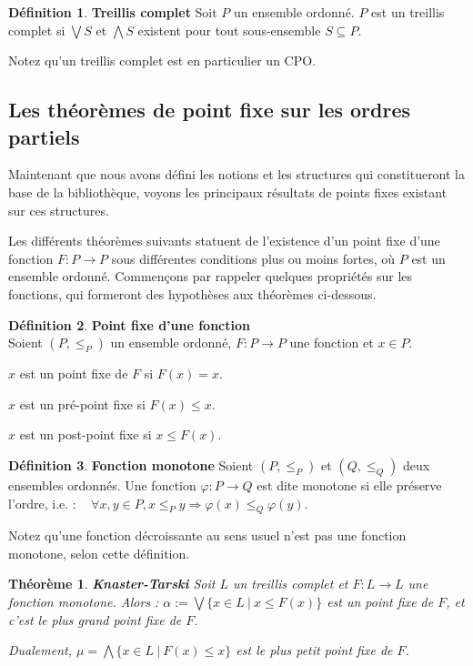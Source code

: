 \documentclass{article}
\newtheorem{theorem}{Théorème}[section]
\theoremstyle{definition}
\newtheorem{definition}{Définition}[section]
\begin{document}
\begin{definition}{\textbf{Treillis complet}}
Soit $P$ un ensemble ordonné. $P$ est un treillis complet si $\bigvee S$ et $\bigwedge S$ existent pour tout sous-ensemble $S \subseteq P$.

\end{definition}
Notez qu'un treillis complet est en particulier un CPO.

\subsection{Les théorèmes de point fixe sur les ordres partiels}

Maintenant que nous avons défini les notions et les structures qui constitueront la base de la bibliothèque, voyons les principaux résultats de points fixes existant sur ces structures.

Les différents théorèmes suivants statuent de l'existence d'un point fixe d'une fonction $F : P \rightarrow P$ sous différentes conditions plus ou moins fortes, où $P$ est un ensemble ordonné. Commençons par rappeler quelques propriétés sur les fonctions, qui formeront des hypothèses aux théorèmes ci-dessous.

\begin{definition}{\textbf{Point fixe d'une fonction\\}}
\label{fixpoint-def}
Soient $(P, \leq_P)$ un ensemble ordonné, $F : P \rightarrow P$ une fonction et $x \in P$. 

$x$ est un point fixe de $F$ si $F(x) = x$.

$x$ est un pré-point fixe si $F(x) \leq x$.

$x$ est un post-point fixe si $x \leq F(x)$.
\end{definition}

\begin{definition}{\textbf{Fonction monotone}}
Soient $(P, \leq_P)$ et $(Q, \leq_Q)$ deux ensembles ordonnés. Une fonction $\varphi : P \rightarrow Q$ est dite monotone si elle préserve l'ordre, i.e. : ~ $\forall x, y \in P, x \leq_P y \Longrightarrow \varphi(x) \leq_Q \varphi(y)$.

Notez qu'une fonction décroissante au sens usuel n'est pas une fonction monotone, selon cette définition.
\end{definition}

\begin{theorem}{\textbf{Knaster-Tarski}}
Soit $L$ un treillis complet et $F : L \rightarrow L$ une fonction monotone. Alors :
$ \alpha := \bigvee \{x \in L ~|~ x \leq F(x)\}$
est un point fixe de $F$, et c'est le plus grand point fixe de $F$.

\noindent Dualement, $\mu = \bigwedge \{x \in L ~|~ F(x) \leq x\}$ est le plus petit point fixe de $F$.
\end{theorem}
\end{document}
